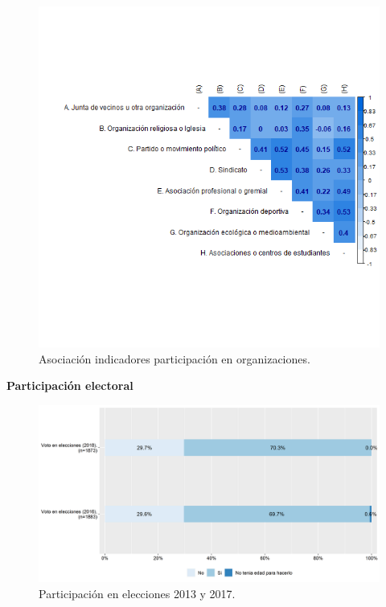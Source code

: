 \documentclass[
  12pt,
]{book}
\begin{document}
\begin{figure}[H]

{\centering \includegraphics[width=1\linewidth,height=1\textheight]{output/graphs/participacion-organizaciones_cor} 

}

\caption{Asociación indicadores participación en organizaciones.}\label{fig:participacion-organizaciones-cor}
\end{figure}

\textbf{Participación electoral}

\begin{figure}[H]

{\centering \includegraphics[width=1\linewidth,height=1\textheight]{output/graphs/participacion-electoral} 

}

\caption{Participación en elecciones 2013 y 2017.}\label{fig:participacion-electoral}
\end{figure}
\end{document}

